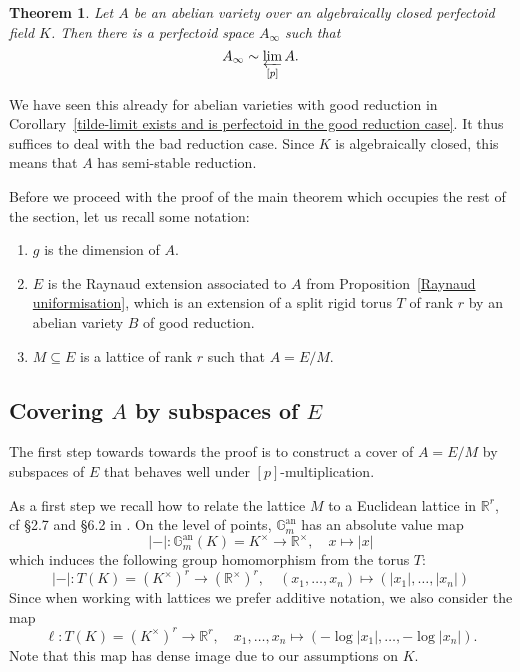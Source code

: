 \documentclass[10pt,oneside]{amsart}
\newtheorem{theorem}{Theorem}[section]
\theoremstyle{definition}
\begin{document}
	\begin{theorem}\label{main theorem}
		Let $A$ be an abelian variety over an algebraically closed perfectoid field $K$. Then there is a perfectoid space $A_\infty$ such that
				\[A_\infty \sim \varprojlim_{[p]} A.\]
	\end{theorem}
 
	We have seen this already for abelian varieties with good reduction in Corollary~\ref{tilde-limit exists and is perfectoid in the good reduction case}. It thus suffices to deal with the bad reduction case. Since $K$ is algebraically closed, this means that $A$ has semi-stable reduction.
 
	
Before we proceed with the proof of the main theorem which occupies the rest of the section, let us recall some notation:
\begin{enumerate} 
\item  $g$ is the dimension of $A$. 
\item  $E$ is the Raynaud extension associated to $A$ from Proposition~\ref{Raynaud uniformisation}, which is an extension of a split rigid torus $T$ of rank $r$ by an abelian variety $B$ of good reduction. 
\item $M\subseteq E$  is a lattice of rank $r$ such that $A=E/M$. 
\end{enumerate}

	
	\subsection{Covering $A$ by subspaces of $E$}
		The first step towards towards the proof is to construct a cover of $A = E/M$ by subspaces of $E$ that behaves well under $[p]$-multiplication.
	
	As a first step we recall how to relate the lattice $M$ to a Euclidean lattice in $\mathbb R^r$, cf \S2.7 and \S6.2 in  \cite{rigid geometry of curves}. On the level of points, $\mathbb{G}_m^{\operatorname{an}}$ has an absolute value map
	\[|-|:\mathbb{G}_m^{\operatorname{an}}(K)=K^\times\rightarrow \mathbb R^\times, \quad x\mapsto |x|\]
	which induces the following group homomorphism from the torus $T$:
	\[|-|:T(K)=(K^\times)^r\rightarrow (\mathbb R^\times)^r, \quad (x_1,\dots,x_n)\mapsto (|x_1|,\dots,|x_n|)\]
	Since when working with lattices we prefer additive notation, we also consider the map
	\[\ell:T(K)=(K^\times)^r\rightarrow \mathbb R^r, \quad x_1,\dots,x_n\mapsto (-\log |x_1|,\dots,-\log |x_n|).\]
	Note that this map has dense image due to our assumptions on $K$.
	
\end{document}
